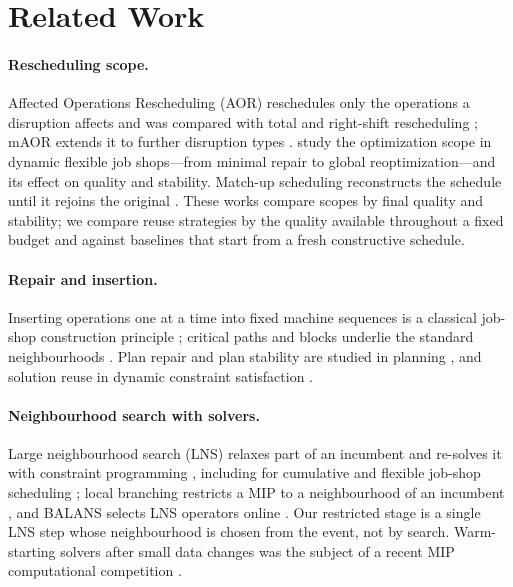 \documentclass[letterpaper]{article} %
\begin{document}
\section{Related Work}

\paragraph{Rescheduling scope.} Affected Operations Rescheduling (AOR) reschedules only the operations a disruption affects and was compared with total and right-shift rescheduling \citep{abumaizar1997}; mAOR extends it to further disruption types \citep{subramaniam2003}. \citet{sun2026} study the optimization scope in dynamic flexible job shops---from minimal repair to global reoptimization---and its effect on quality and stability. Match-up scheduling reconstructs the schedule until it rejoins the original \citep{bean1991}. These works compare scopes by final quality and stability; we compare reuse strategies by the quality available throughout a fixed budget and against baselines that start from a fresh constructive schedule.

\paragraph{Repair and insertion.} Inserting operations one at a time into fixed machine sequences is a classical job-shop construction principle \citep{werner1995}; critical paths and blocks underlie the standard neighbourhoods \citep{vanlaarhoven1992,nowicki1996}. Plan repair and plan stability are studied in planning \citep{nebel1995,vanderkrogt2005,fox2006}, and solution reuse in dynamic constraint satisfaction \citep{verfaillie1994}.

\paragraph{Neighbourhood search with solvers.} Large neighbourhood search (LNS) relaxes part of an incumbent and re-solves it with constraint programming \citep{shaw1998}, including for cumulative and flexible job-shop scheduling \citep{godard2005,pacino2011}; local branching restricts a MIP to a neighbourhood of an incumbent \citep{fischetti2003}, and BALANS selects LNS operators online \citep{cai2025}. Our restricted stage is a single LNS step whose neighbourhood is chosen from the event, not by search. Warm-starting solvers after small data changes was the subject of a recent MIP computational competition \citep{bolusani2024}.
\end{document}
